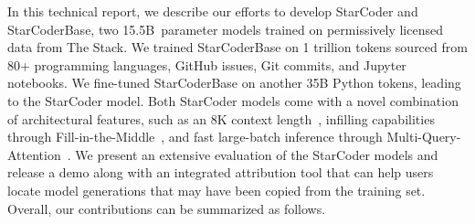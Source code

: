 In this technical report, we describe our efforts to develop StarCoder and StarCoderBase, two 15.5B~parameter models trained on permissively licensed data from The Stack. We trained StarCoderBase on 1 trillion tokens sourced from 80+ programming languages, GitHub issues, Git commits, and Jupyter notebooks. We fine-tuned StarCoderBase on another 35B Python tokens, leading to the StarCoder model. Both StarCoder models come with a novel combination of architectural features, such as an 8K context length~\citep{dao2022flashattention}, infilling capabilities through Fill-in-the-Middle~\citep[FIM;][]{bavarian2022fim}, and fast large-batch inference through Multi-Query-Attention~\citep[MQA;][]{shazeer2019mqa}. We present an extensive evaluation of the StarCoder models and release a demo along with an integrated attribution tool that can help users locate model generations that may have been copied from the training set. Overall, our contributions can be summarized as follows.
